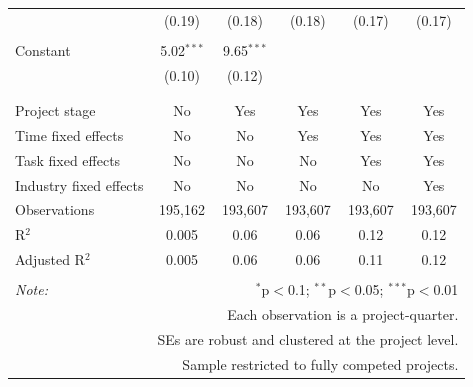 \documentclass[
]{article}
\begin{document}
\begin{table}[H]
\begin{tabular}{@{\extracolsep{-2pt}}lccccc}
  & (0.19) & (0.18) & (0.18) & (0.17) & (0.17) \\ 
  & & & & & \\ 
 Constant & 5.02$^{***}$ & 9.65$^{***}$ &  &  &  \\ 
  & (0.10) & (0.12) &  &  &  \\ 
  & & & & & \\ 
\hline \\[-1.8ex] 
Project stage & No & Yes & Yes & Yes & Yes \\ 
Time fixed effects & No & No & Yes & Yes & Yes \\ 
Task fixed effects & No & No & No & Yes & Yes \\ 
Industry fixed effects & No & No & No & No & Yes \\ 
Observations & 195,162 & 193,607 & 193,607 & 193,607 & 193,607 \\ 
R$^{2}$ & 0.005 & 0.06 & 0.06 & 0.12 & 0.12 \\ 
Adjusted R$^{2}$ & 0.005 & 0.06 & 0.06 & 0.11 & 0.12 \\ 
\hline 
\hline \\[-1.8ex] 
\textit{Note:}  & \multicolumn{5}{r}{$^{*}$p$<$0.1; $^{**}$p$<$0.05; $^{***}$p$<$0.01} \\ 
 & \multicolumn{5}{r}{Each observation is a project-quarter.} \\ 
 & \multicolumn{5}{r}{SEs are robust and clustered at the project level.} \\ 
 & \multicolumn{5}{r}{Sample restricted to fully competed projects.} \\ 
\end{tabular} 
\end{table}
\end{document}
